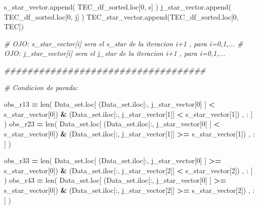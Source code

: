 \documentclass[
  11pt,
  a4paper,
]{article}
\newenvironment{Shaded}{\begin{snugshade}}{\end{snugshade}}
\newcommand{\BuiltInTok}[1]{#1}
\newcommand{\CommentTok}[1]{\textcolor[rgb]{0.56,0.35,0.01}{\textit{#1}}}
\newcommand{\DecValTok}[1]{\textcolor[rgb]{0.00,0.00,0.81}{#1}}
\newcommand{\NormalTok}[1]{#1}
\newcommand{\OperatorTok}[1]{\textcolor[rgb]{0.81,0.36,0.00}{\textbf{#1}}}
\newcommand{\StringTok}[1]{\textcolor[rgb]{0.31,0.60,0.02}{#1}}
\begin{document}
\begin{Shaded}
\begin{Highlighting}[]
\NormalTok{        s\_star\_vector.append( TEC\_df\_sorted.loc[}\DecValTok{0}\NormalTok{, }\StringTok{\textquotesingle{}s\textquotesingle{}}\NormalTok{] )}
\NormalTok{        j\_star\_vector.append( TEC\_df\_sorted.loc[}\DecValTok{0}\NormalTok{, }\StringTok{\textquotesingle{}j\textquotesingle{}}\NormalTok{] )}
\NormalTok{        TEC\_star\_vector.append(TEC\_df\_sorted.loc[}\DecValTok{0}\NormalTok{, }\StringTok{\textquotesingle{}TEC\textquotesingle{}}\NormalTok{])}

        \CommentTok{\# OJO: s\_star\_vector[i] sera el s\_star de la iteracion i+1 , para i=0,1,...}
        \CommentTok{\# OJO: j\_star\_vector[i] sera el j\_star de la iteracion i+1 , para i=0,1,... }


      \CommentTok{\#\#\#\#\#\#\#\#\#\#\#\#\#\#\#\#\#\#\#\#\#\#\#\#\#\#\#\#\#\#\#\#\#\#\#}

        \CommentTok{\# Condicion de parada:}

\NormalTok{        obs\_r13 }\OperatorTok{=} \BuiltInTok{len}\NormalTok{( Data\_set.loc[ (Data\_set.iloc[:, j\_star\_vector[}\DecValTok{0}\NormalTok{] ] }\OperatorTok{\textless{}}\NormalTok{ s\_star\_vector[}\DecValTok{0}\NormalTok{]) }\OperatorTok{\&}\NormalTok{ (Data\_set.iloc[:, j\_star\_vector[}\DecValTok{1}\NormalTok{]] }\OperatorTok{\textless{}}\NormalTok{ s\_star\_vector[}\DecValTok{1}\NormalTok{]) , : ] )}
\NormalTok{        obs\_r23 }\OperatorTok{=} \BuiltInTok{len}\NormalTok{( Data\_set.loc[ (Data\_set.iloc[:, j\_star\_vector[}\DecValTok{0}\NormalTok{] ] }\OperatorTok{\textless{}}\NormalTok{ s\_star\_vector[}\DecValTok{0}\NormalTok{]) }\OperatorTok{\&}\NormalTok{ (Data\_set.iloc[:, j\_star\_vector[}\DecValTok{1}\NormalTok{]] }\OperatorTok{\textgreater{}=}\NormalTok{ s\_star\_vector[}\DecValTok{1}\NormalTok{]) , : ] )}

\NormalTok{        obs\_r33 }\OperatorTok{=} \BuiltInTok{len}\NormalTok{( Data\_set.loc[ (Data\_set.iloc[:, j\_star\_vector[}\DecValTok{0}\NormalTok{] ] }\OperatorTok{\textgreater{}=}\NormalTok{ s\_star\_vector[}\DecValTok{0}\NormalTok{]) }\OperatorTok{\&}\NormalTok{ (Data\_set.iloc[:, j\_star\_vector[}\DecValTok{2}\NormalTok{]] }\OperatorTok{\textless{}}\NormalTok{ s\_star\_vector[}\DecValTok{2}\NormalTok{]) , : ] )}
\NormalTok{        obs\_r43 }\OperatorTok{=} \BuiltInTok{len}\NormalTok{( Data\_set.loc[ (Data\_set.iloc[:, j\_star\_vector[}\DecValTok{0}\NormalTok{] ] }\OperatorTok{\textgreater{}=}\NormalTok{ s\_star\_vector[}\DecValTok{0}\NormalTok{]) }\OperatorTok{\&}\NormalTok{ (Data\_set.iloc[:, j\_star\_vector[}\DecValTok{2}\NormalTok{]] }\OperatorTok{\textgreater{}=}\NormalTok{ s\_star\_vector[}\DecValTok{2}\NormalTok{]) , : ] )}



\end{Highlighting}
\end{Shaded}
\end{document}
